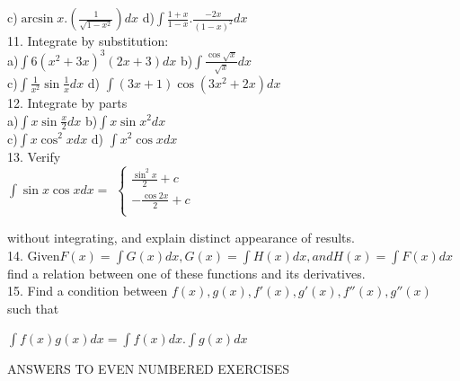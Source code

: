 \documentclass[11pt]{amsbook}
\begin{document}
 	\quad c)$ \arcsin x . (\frac{1}{\sqrt{1-x^2}}) dx $     \quad \quad \quad \quad \quad \enskip  d)$ \int \frac{1+x}{1-x} . \frac{-2x}{(1-x)^2} dx $ \\

	11. Integrate by substitution: \\

	 \quad a)$ \int 6(x^2 + 3x)^3 (2x+3)dx $  \quad  \quad  \quad   b)$ \int \frac{\cos \sqrt x }{\sqrt x} dx $ \\

	 \quad c)$ \int \frac{1}{x^2} \sin \frac{1}{x} dx $  \quad  \quad  \quad  \quad  \quad  \quad  \quad  \quad \enskip  d) $ \int (3x+1) \cos {(3x^2 + 2x)} dx $ \\
	
	12. Integrate by parts  \\

	 \quad a)$ \int x \sin \frac{x}{2}dx $   \quad \quad \quad \quad \quad \quad \quad \quad \quad b)$ \int x \sin x^2 dx $ \\

	 \quad c)$ \int x \cos ^2x dx $   \quad  \quad  \quad  \quad  \quad  \quad  \quad  \quad  \enskip d) $ \int x^2 \cos x dx $ \\

	13. Verify \\

	{\centering $ \int \sin x \cos x dx = $   $\begin{cases}

	\frac{\sin^2 x}{2}+ c \\

	-\frac{\cos 2x}{2}+c \\

	\end{cases} $ \\}

	\medskip

	without integrating, and explain distinct appearance of results. \\

	14. Given$ F(x) = \int G(x)dx,G(x) = \int H(x)dx, and H(x) =\int F(x)dx$ find a relation between one of these functions and its derivatives.  \\

	15. Find a condition between $ f(x), g(x), f'(x), g'(x), f''(x), g''(x)$ such that \\

	{\centering  $ \int f(x) g(x) dx = \int f(x) dx . \int g(x)dx $ \\

	\medskip \medskip

	ANSWERS TO EVEN NUMBERED EXERCISES \\ }
\end{document}

